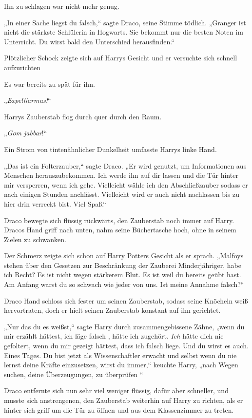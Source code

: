 {Ihn zu schlagen war nicht mehr genug.

„In einer Sache liegst du falsch,“ sagte Draco, seine Stimme tödlich. „Granger ist nicht die stärkste Schlülerin in Hogwarts. Sie bekommt nur die besten Noten im Unterricht. Du wirst bald den Unterschied herausfinden.“

Plötzlicher Schock zeigte sich auf Harrys Gesicht und er versuchte sich schnell aufzurichten \later

Es war bereits zu spät für ihn.

„\emph{Expelliarmus!}“

Harrys Zauberstab flog durch quer durch den Raum.

„\emph{Gom jabbar}!“

Ein Strom von tintenähnlicher Dunkelheit umfasste Harrys linke Hand.

„Das ist ein Folterzauber,“ sagte Draco. „Er wird genutzt, um Informationen aus Menschen herauszubekommen. Ich werde ihn auf dir lassen und die Tür hinter mir versperren, wenn ich gehe. Vielleicht wähle ich den Abschließzauber sodass er nach einigen Stunden nachlässt. Vielleicht wird er auch nicht nachlassen bis zu hier drin verreckt bist. Viel Spaß.“

Draco bewegte sich flüssig rückwärts, den Zauberstab noch immer auf Harry. Dracos Hand griff nach unten, nahm seine Büchertasche hoch, ohne in seinem Zielen zu schwanken.

Der Schmerz zeigte sich schon auf Harry Potters Gesicht als er sprach. „Malfoys stehen über den Gesetzen zur Beschränkung der Zauberei Minderjähriger, habe ich Recht? Es ist nicht wegen stärkerem Blut. Es ist weil du bereits geübt hast. Am Anfang warst du so schwach wie jeder von uns. Ist meine Annahme falsch?“

Draco Hand schloss sich fester um seinen Zauberstab, sodass seine Knöcheln weiß hervortraten, doch er hielt seinen Zauberstab konstant auf ihn gerichtet.

„Nur das du es weißst,“ sagte Harry durch zusammengebissene Zähne, „wenn du mir erzählt hättest, ich läge falsch , hätte ich zugehört. \emph{Ich} hätte dich nie gefoltert, wenn du mir gezeigt hättest, dass ich falsch liege. Und du wirst es auch. Eines Tages. Du bist jetzt als Wissenschaftler erwacht und selbst wenn du nie lernst deine Kräfte einzusetzen, wirst du immer,“ keuchte Harry, „nach Wegen suchen, deine Überzeugungen, zu überprüfen \later“

Draco entfernte sich nun sehr viel weniger flüssig, dafür aber schneller, und musste sich anstrengenen, den Zauberstab weiterhin auf Harry zu richten, als er hinter sich griff um die Tür zu öffnen und aus dem Klassenzimmer zu treten.

}
